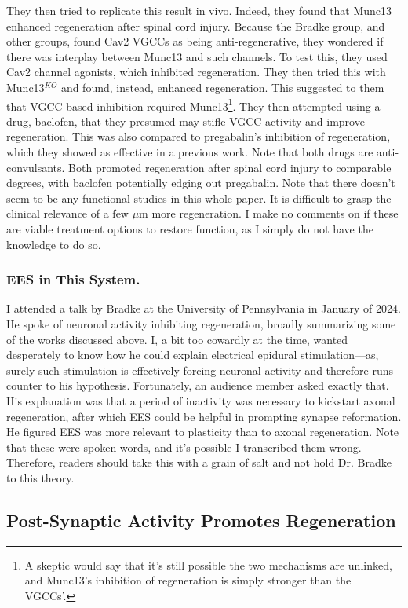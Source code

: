 They then tried to replicate this result in vivo. Indeed, they found that Munc13 enhanced regeneration after spinal cord injury. Because the Bradke group, and other groups, found Cav2 VGCCs as being anti-regenerative, they wondered if there was interplay between Munc13 and such channels. To test this, they used Cav2 channel agonists, which inhibited regeneration. They then tried this with Munc13$^{KO}$ and found, instead, enhanced regeneration. This suggested to them that VGCC-based inhibition required Munc13\footnote{A skeptic would say that it's still possible the two mechanisms are unlinked, and Munc13's inhibition of regeneration is simply stronger than the VGCCs'.}. They then attempted using a drug, baclofen, that they presumed may stifle VGCC activity and improve regeneration. This was also compared to pregabalin's inhibition of regeneration, which they showed as effective in a previous work. Note that both drugs are anti-convulsants. Both promoted regeneration after spinal cord injury to comparable degrees, with baclofen potentially edging out pregabalin. Note that there doesn't seem to be any functional studies in this whole paper. It is difficult to grasp the clinical relevance of a few $\mu$m more regeneration. I make no comments on if these are viable treatment options to restore function, as I simply do not have the knowledge to do so.

\subsubsection{EES in This System.}

I attended a talk by Bradke at the University of Pennsylvania in January of 2024. He spoke of neuronal activity inhibiting regeneration, broadly summarizing some of the works discussed above. I, a bit too cowardly at the time, wanted desperately to know how he could explain electrical epidural stimulation---as, surely such stimulation is effectively forcing neuronal activity and therefore runs counter to his hypothesis. Fortunately, an audience member asked exactly that. His explanation was that a period of inactivity was necessary to kickstart axonal regeneration, after which EES could be helpful in prompting synapse reformation. He figured EES was more relevant to plasticity than to axonal regeneration. Note that these were spoken words, and it's possible I transcribed them wrong. Therefore, readers should take this with a grain of salt and not hold Dr. Bradke to this theory. 


\subsection{Post-Synaptic Activity Promotes Regeneration}

